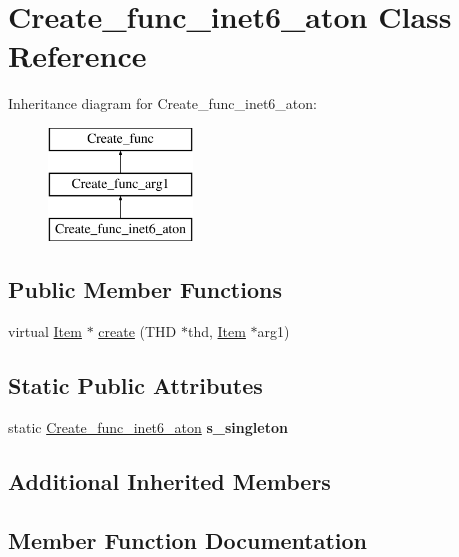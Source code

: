 \hypertarget{classCreate__func__inet6__aton}{}\section{Create\+\_\+func\+\_\+inet6\+\_\+aton Class Reference}
\label{classCreate__func__inet6__aton}
Inheritance diagram for Create\+\_\+func\+\_\+inet6\+\_\+aton\+:\begin{figure}[H]
\begin{center}
\leavevmode
\includegraphics[height=3.000000cm]{classCreate__func__inet6__aton}
\end{center}
\end{figure}
\subsection*{Public Member Functions}
\begin{DoxyCompactItemize}
\item 
virtual \mbox{\hyperlink{classItem}{Item}} $\ast$ \mbox{\hyperlink{classCreate__func__inet6__aton_af4f89f39eb417a805482faecdeda7712}{create}} (T\+HD $\ast$thd, \mbox{\hyperlink{classItem}{Item}} $\ast$arg1)
\end{DoxyCompactItemize}
\subsection*{Static Public Attributes}
\begin{DoxyCompactItemize}
\item 
\mbox{\label{classCreate__func__inet6__aton_abd4596db83f0c19c7414875672d08bf9}} 
static \mbox{\hyperlink{classCreate__func__inet6__aton}{Create\+\_\+func\+\_\+inet6\+\_\+aton}} {\bfseries s\+\_\+singleton}
\end{DoxyCompactItemize}
\subsection*{Additional Inherited Members}


\subsection{Member Function Documentation}
\mbox{\label{classCreate__func__inet6__aton_af4f89f39eb417a805482faecdeda7712}} 
